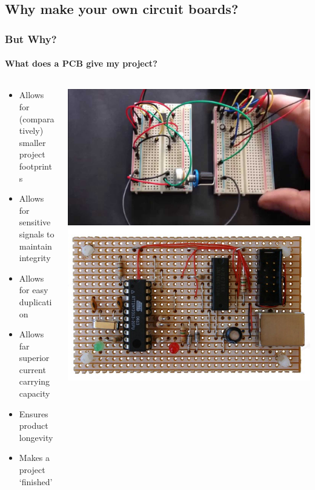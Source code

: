 \documentclass[]{beamer}
\begin{document}
\subsection[But Why?]{Why make your own circuit boards?}
\begin{frame}
    \frametitle{But Why?}
    \framesubtitle{What does a PCB give my project?}
    \begin{columns}[T]
        \begin{column}[T]{5cm}
            \begin{itemize}[<+->]
                \item{Allows for (comparatively) smaller project footprints}
                \item{Allows for sensitive signals to maintain integrity}
                \item{Allows for easy duplication}
                \item{Allows far superior current carrying capacity}
                \item{Ensures product longevity}
                \item{Makes a project `finished'}
            \end{itemize}
        \end{column}
        \begin{column}[T]{5cm}
            \includegraphics[width=0.40\paperwidth,keepaspectratio]{images/breadboard.jpg}
            \includegraphics[width=0.40\paperwidth,keepaspectratio]{images/veroboard.jpg}
        \end{column}
    \end{columns}
\end{frame}
\end{document}
